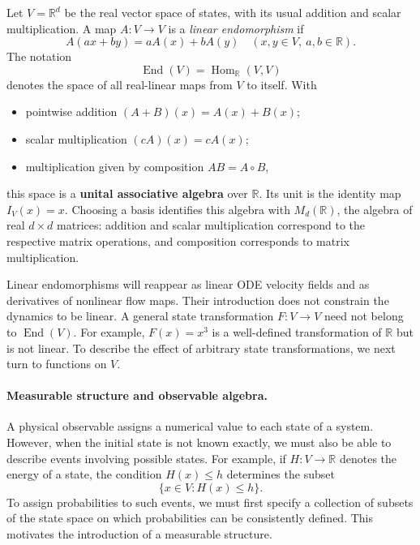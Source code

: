 \documentclass[12pt,a4paper,oneside]{book}
\begin{document}
\begin{definition}
Let $V=\mathbb R^d$ be the real vector space of states, with its usual addition and scalar multiplication. A map $A:V\to V$
is a \emph{linear endomorphism} if
\begin{equation*}
    A(ax+by)=aA(x)+bA(y) \quad(x,y\in V,\ a,b\in\mathbb R).
\end{equation*}
The notation
\begin{equation*}
    \operatorname{End}(V)=\operatorname{Hom}_{\mathbb R}(V,V)
\end{equation*}
denotes the space of all real-linear maps from $V$ to itself. With
\begin{itemize}
  \item pointwise addition $(A+B)(x)=A(x)+B(x)$;
  \item scalar multiplication $(cA)(x)=cA(x)$;
  \item multiplication given by composition $AB=A\circ B$,
\end{itemize}
this space is a \textbf{unital associative algebra} over $\mathbb R$. Its unit is the identity map $I_V(x)=x$. Choosing
a basis identifies this algebra with $M_d(\mathbb R)$, the algebra of real $d\times d$ matrices: addition and scalar
multiplication correspond to the respective matrix operations, and composition corresponds to matrix multiplication.
\end{definition}

Linear endomorphisms will reappear as linear ODE velocity fields and as derivatives of nonlinear flow maps. Their introduction
does not constrain the dynamics to be linear. A general state transformation $F:V\to V$ need not belong to $\operatorname{End}(V)$.
For example, $F(x)=x^3$ is a well-defined transformation of $\mathbb R$ but is not linear. To describe the effect of arbitrary
state transformations, we next turn to functions on $V$.

\paragraph{Measurable structure and observable algebra.}

A physical observable assigns a numerical value to each state of a system. However, when the initial state is not known
exactly, we must also be able to describe events involving possible states. For example, if $H:V\to\mathbb R$ denotes the
energy of a state, the condition $H(x)\leq h$ determines the subset
\begin{equation*}
    \{x\in V:H(x)\leq h\}.
\end{equation*}
To assign probabilities to such events, we must first specify a collection of subsets of the state space on which probabilities
can be consistently defined. This motivates the introduction of a measurable structure.
\end{document}
